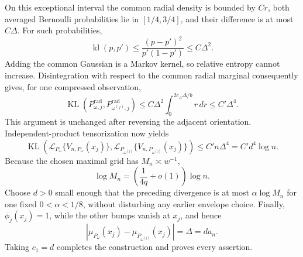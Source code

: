 On this exceptional interval the common radial density is bounded by \(Cr\), both averaged Bernoulli probabilities lie in \([1/4,3/4]\), and their difference is at most \(C\Delta\).  For such probabilities,
\[
 \operatorname{kl}(p,p')
 \leq\frac{(p-p')^2}{p'(1-p')}
 \leq C\Delta^2.
\]
Adding the common Gaussian is a Markov kernel, so relative entropy cannot increase.  Disintegration with respect to the common radial marginal consequently gives, for one compressed observation,
\[
 \operatorname{KL}(P^{\mathrm{rad}}_{\omega,j},P^{\mathrm{rad}}_{\omega^{(j)},j})
 \leq C\Delta^2\int_0^{2c_A\Delta/b}r\,dr
 \leq C'\Delta^4.
\]
This argument is unchanged after reversing the adjacent orientation.  Independent-product tensorization now yields
\[
 \operatorname{KL}\!\left(
 \mathcal L_{P_\omega}\{V_{n,P_\omega}(x_j)\},
 \mathcal L_{P_{\omega^{(j)}}}\{V_{n,P_{\omega^{(j)}}}(x_j)\}
 \right)
 \leq C'n\Delta^4=C'd^4\log n.
\]
Because the chosen maximal grid has \(M_n\asymp w^{-1}\),
\[
 \log M_n=\left(\frac{1}{4q}+o(1)\right)\log n.
\]
Choose \(d>0\) small enough that the preceding divergence is at most \(\alpha\log M_n\) for one fixed \(0<\alpha<1/8\), without disturbing any earlier envelope choice.  Finally, \(\phi_j(x_j)=1\), while the other bumps vanish at \(x_j\), and hence
\[
 |\mu_{P_\omega}(x_j)-\mu_{P_{\omega^{(j)}}}(x_j)|
 =\Delta=d a_n.
\]
Taking \(c_1=d\) completes the construction and proves every assertion.